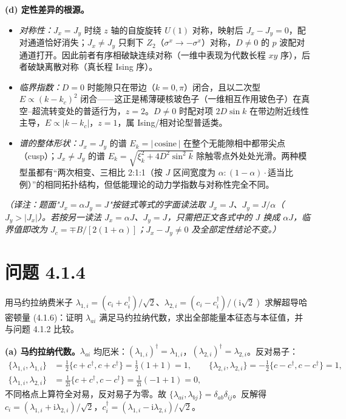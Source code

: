 \textbf{(d) 定性差异的根源。}
\begin{itemize}
\item \emph{对称性：}$J_x=J_y$ 时绕 $z$ 轴的自旋旋转 $U(1)$ 对称，映射后 $J_x-J_y=0$，配对通道恰好消失；$J_x\neq J_y$ 只剩下 $Z_2$（$\sigma^x\to-\sigma^x$）对称，$D\neq0$ 的 $p$ 波配对通道打开。因此前者有序相破缺连续对称（一维中表现为代数长程 $xy$ 序），后者破缺离散对称（真长程 Ising 序）。
\item \emph{临界指数：}$D=0$ 时能隙只在带边（$k=0,\pi$）闭合，且以二次型 $E\propto(k-k_c)^2$ 闭合——这正是稀薄硬核玻色子（一维相互作用玻色子）在真空--超流转变处的普适行为，$z=2$。$D\neq0$ 时配对项 $2D\sin k$ 在带边附近线性主导，$E\propto|k-k_c|$，$z=1$，属 Ising/相对论型普适类。
\item \emph{谱的整体形状：}$J_x=J_y$ 的谱 $E_k=|\,\text{cosine}\,|$ 在整个无能隙相中都带尖点（cusp）；$J_x\neq J_y$ 的谱 $E_k=\sqrt{\xi_k^2+4D^2\sin^2k}$ 除触零点外处处光滑。两种模型虽都有“两次相变、三相比 2:1:1（按 $J$ 区间宽度为 $\alpha:(1-\alpha)\cdot$适当比例）”的相同拓扑结构，但低能理论的动力学指数与对称性完全不同。
\end{itemize}

\emph{（译注：题面"$J_x=\alpha J_y=J$"按链式等式的字面读法取 $J_x=J$、$J_y=J/\alpha$（$J_y>|J_x|$）。若按另一读法 $J_x=\alpha J$、$J_y=J$，只需把正文各式中的 $J$ 换成 $\alpha J$，临界值即改为 $J_c=\mp B/[2(1+\alpha)]$；$J_x-J_y\neq0$ 及全部定性结论不变。）}

\section*{问题 4.1.4}
\begin{problem}
用马约拉纳费米子 $\lambda_{1,i}=(c_i+c^\dagger_i)/\sqrt2$、$\lambda_{2,i}=(c_i-c^\dagger_i)/(\mathrm{i}\sqrt2)$ 求解超导哈密顿量 (4.1.6)：证明 $\lambda_{ai}$ 满足马约拉纳代数，求出全部能量本征态与本征值，并与问题 4.1.2 比较。
\end{problem}
\solution
\textbf{(a) 马约拉纳代数。}$\lambda_{ai}$ 均厄米：$(\lambda_{1,i})^\dagger=\lambda_{1,i}$，$(\lambda_{2,i})^\dagger=\lambda_{2,i}$。反对易子：
\begin{align*}
\{\lambda_{1,i},\lambda_{1,i}\}&=\tfrac12\{c+c^\dagger,c+c^\dagger\}=\tfrac12(1+1)=1,\qquad
\{\lambda_{2,i},\lambda_{2,i}\}=-\tfrac12\{c-c^\dagger,c-c^\dagger\}=1,\\
\{\lambda_{1,i},\lambda_{2,i}\}&=\tfrac{1}{2\mathrm{i}}\{c+c^\dagger,c-c^\dagger\}=\tfrac{1}{2\mathrm{i}}(-1+1)=0,
\end{align*}
不同格点上算符全对易，反对易子为零。故 $\{\lambda_{ai},\lambda_{bj}\}=\delta_{ab}\delta_{ij}$。反解得 $c_i=(\lambda_{1,i}+\mathrm{i}\lambda_{2,i})/\sqrt2$，$c^\dagger_i=(\lambda_{1,i}-\mathrm{i}\lambda_{2,i})/\sqrt2$。

